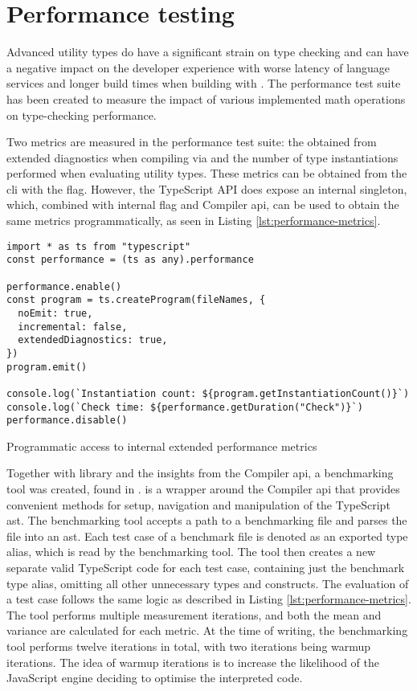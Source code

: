 \section{Performance testing}

Advanced utility types do have a significant strain on type checking and can have a negative impact on the developer experience with worse latency of language services and longer build times when building with . The performance test suite has been created to measure the impact of various implemented math operations on type-checking performance.

Two metrics are measured in the performance test suite: the  obtained from extended diagnostics when compiling via  and the number of type instantiations performed when evaluating utility types. These metrics can be obtained from the  \acrshort{cli} with the  flag. However, the TypeScript API does expose an internal  singleton, which, combined with internal  flag and Compiler \acrshort{api}, can be used to obtain the same metrics programmatically, as seen in Listing \ref{lst:performance-metrics}.

\begin{listing}[ht]
  \begin{verbatim}
import * as ts from "typescript"
const performance = (ts as any).performance

performance.enable()
const program = ts.createProgram(fileNames, {
  noEmit: true,
  incremental: false,
  extendedDiagnostics: true,
})
program.emit()

console.log(`Instantiation count: ${program.getInstantiationCount()}`)
console.log(`Check time: ${performance.getDuration("Check")}`)
performance.disable()
\end{verbatim}
  \caption{Programmatic access to internal extended performance metrics}\label{lst:performance-metrics}
\end{listing}

Together with  library \cite{sherretTsmorph2023} and the insights from the Compiler \acrshort{api}, a benchmarking tool was created, found in .  is a wrapper around the Compiler \acrshort{api} that provides convenient methods for setup, navigation and manipulation of the TypeScript \acrshort{ast}. The benchmarking tool accepts a path to a benchmarking file and parses the file into an \acrshort{ast}. Each test case of a benchmark file is denoted as an exported type alias, which is read by the benchmarking tool. The tool then creates a new separate valid TypeScript code for each test case, containing just the benchmark type alias, omitting all other unnecessary types and constructs. The evaluation of a test case follows the same logic as described in Listing \ref{lst:performance-metrics}. The tool performs multiple measurement iterations, and both the mean and variance are calculated for each metric. At the time of writing, the benchmarking tool performs twelve iterations in total, with two iterations being warmup iterations. The idea of warmup iterations is to increase the likelihood of the JavaScript engine deciding to optimise the interpreted code.

